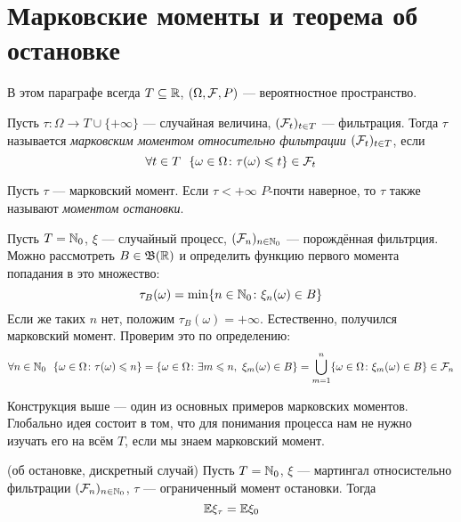 \section{Марковские моменты и теорема об остановке}

\begin{note}
	В этом параграфе всегда $T \subseteq \mathbb{R}$, $(\Omega, \mathcal{F}, P)$ --- вероятностное пространство.
\end{note}

\begin{definition}
	Пусть $\tau \colon \Omega \to T \cup \{+\infty\}$ --- случайная величина, $(\mathcal{F}_t)_{t \in T}$ --- фильтрация. Тогда $\tau$ называется \textit{марковским моментом относительно фильтрации $(\mathcal{F}_t)_{t \in T}$}, если
	\[
		\forall t \in T\ \ \{\omega \in \Omega \colon \tau(\omega) \leqslant t\} \in \mathcal{F}_t
	\]
\end{definition}

\begin{definition}
	Пусть $\tau$ --- марковский момент. Если $\tau < +\infty$ $P$-почти наверное, то $\tau$ также называют \textit{моментом остановки}.
\end{definition}

\begin{example}
	Пусть $T = \mathbb{N}_0$, $\xi$ --- случайный процесс, $(\mathcal{F}_n)_{n \in \mathbb{N}_0}$ --- порождённая фильтрция. Можно рассмотреть $B \in \mathfrak{B}(\mathbb{R})$ и определить функцию первого момента попадания в это множество:
	\[
		\tau_B(\omega) = \min \{n \in \mathbb{N}_0 \colon \xi_n(\omega) \in B\}
	\]
	Если же таких $n$ нет, положим $\tau_B(\omega) = +\infty$. Естественно, получился марковский момент. Проверим это по определению:
	\[
		\forall n \in \mathbb{N}_0\ \ \{\omega \in \Omega \colon \tau(\omega) \leqslant n\} = \{\omega \in \Omega \colon \exists m \leqslant n,\ \xi_m(\omega) \in B\} = \bigcup_{m = 1}^n \{\omega \in \Omega \colon \xi_m(\omega) \in B\} \in \mathcal{F}_n
	\]
\end{example}

\begin{note}
	Конструкция выше --- один из основных примеров марковских моментов. Глобально идея состоит в том, что для понимания процесса нам не нужно изучать его на всём $T$, если мы знаем марковский момент.
\end{note}

\begin{theorem} (об остановке, дискретный случай)
	Пусть $T = \mathbb{N}_0$, $\xi$ --- мартингал относистельно фильтрации $(\mathcal{F}_n)_{n \in \mathbb{N}_0}$, $\tau$ --- ограниченный момент остановки. Тогда
	\[
		\mathbb{E}\xi_{\tau} = \mathbb{E}\xi_0
	\]
\end{theorem}

